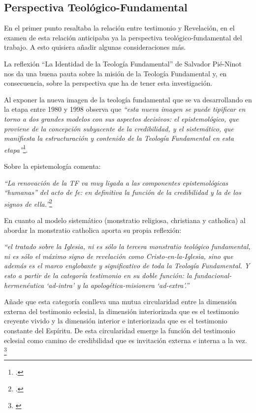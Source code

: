 \documentclass[../main.tex]{subfiles}
\begin{document}
\subsection{Perspectiva Teológico-Fundamental}

En el primer punto resaltaba la relación entre testimonio y Revelación, en el examen de esta relación anticipaba ya la perspectiva teológico-fundamental del trabajo. A esto quisiera añadir algunas consideraciones más.

La reflexión ``La Identidad de la Teología Fundamental'' de Salvador Pié-Ninot nos da una buena pauta sobre la misión de la Teología Fundamental y, en consecuencia, sobre la perspectiva que ha de tener esta investigación. 

Al exponer la nueva imagen de la teología fundamental que se va desarrollando en la etapa entre 1980 y 1998 observa que \emph{``esta nueva imagen se puede tipificar en torno a dos grandes modelos con sus aspectos decisivos: el epistemológico, que proviene de la concepción subyacente de la credibilidad, y el sistemático, que manifiesta la estructuración y contenido de la Teología Fundamental en esta etapa''}\footcite[29]{ninotTF}.

Sobre la epistemología comenta:

\emph{
``La renovación de la TF va muy ligada a las componentes epistemológicas ``humanas'' del acto de fe: en definitiva la función de la credibilidad y la de los signos de ella.''}\footcite[31]{ninotTF}

En cuanto al modelo sistemático (monstratio religiosa, christiana y catholica) al abordar la monstratio catholica aporta su propia reflexión:

\emph{
``el tratado sobre la Iglesia, ni es sólo la tercera monstratio teológico fundamental, ni es sólo el máximo signo de revelación como Cristo-en-la-Iglesia, sino que además es el marco englobante y significativo de toda la Teología Fundamental. Y esto a partir de la categoría testimonio en su doble función: la fundacional-hermenéutica `ad-intra' y la apologética-misionera `ad-extra'.''}

Añade que esta categoría conlleva una mutua circularidad entre la dimensión externa del testimonio eclesial, la dimensión interiorizada que es el testimonio creyente vivido y la dimensión interior e interiorizada que es el testimonio constante del Espíritu. De esta circularidad emerge la función del testimonio eclesial como camino de credibilidad que es invitación externa e interna a la vez. \footnote{\cite[40]{ninotTF}}
\end{document}
